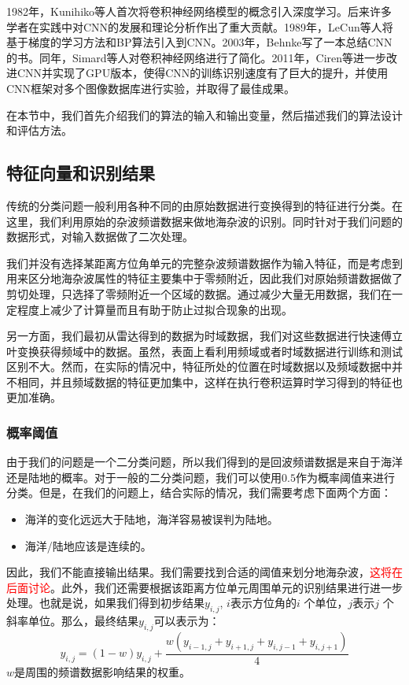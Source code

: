 1982年，Kunihiko等人\cite{fukushima1982neocognitron}首次将卷积神经网络模型的概念引入深度学习。后来许多学者在实践中对CNN的发展和理论分析作出了重大贡献。1989年，LeCun等人将基于梯度的学习方法\cite{lecun1998gradient}和BP算法\cite{lecun1989backpropagation}引入到CNN。2003年，Behnke写了一本总结CNN\cite{behnke2003hierarchical}的书。同年，Simard等人\cite{simard2003best}对卷积神经网络进行了简化。2011年，Ciren等\cite{ciresan2011flexible}进一步改进CNN并实现了GPU版本，使得CNN的训练识别速度有了巨大的提升，并使用CNN框架对多个图像数据库进行实验，并取得了最佳成果。

在本节中，我们首先介绍我们的算法的输入和输出变量，然后描述我们的算法设计和评估方法。
\subsection{特征向量和识别结果}
传统的分类问题一般利用各种不同的由原始数据进行变换得到的特征进行分类。在这里，我们利用原始的杂波频谱数据来做地海杂波的识别。同时针对于我们问题的数据形式，对输入数据做了二次处理。

我们并没有选择某距离方位角单元的完整杂波频谱数据作为输入特征，而是考虑到用来区分地海杂波属性的特征主要集中于零频附近，因此我们对原始频谱数据做了剪切处理，只选择了零频附近一个区域的数据。通过减少大量无用数据，我们在一定程度上减少了计算量而且有助于防止过拟合现象的出现。

另一方面，我们最初从雷达得到的数据为时域数据，我们对这些数据进行快速傅立叶变换获得频域中的数据。虽然，表面上看利用频域或者时域数据进行训练和测试区别不大。然而，在实际的情况中，特征所处的位置在时域数据以及频域数据中并不相同，并且频域数据的特征更加集中，这样在执行卷积运算时学习得到的特征也更加准确。

\subsubsection{概率阈值}
由于我们的问题是一个二分类问题，所以我们得到的是回波频谱数据是来自于海洋还是陆地的概率。对于一般的二分类问题，我们可以使用$ 0.5 $作为概率阈值来进行分类。但是，在我们的问题上，结合实际的情况，我们需要考虑下面两个方面：

\begin{itemize}
	\item 海洋的变化远远大于陆地，海洋容易被误判为陆地。
	\item 海洋/陆地应该是连续的。
\end{itemize}

因此，我们不能直接输出结果。我们需要找到合适的阈值来划分地海杂波，\textcolor{red}{这将在后面讨论}。此外，我们还需要根据该距离方位单元周围单元的识别结果进行进一步处理。也就是说，如果我们得到初步结果$y_{i, j}$, $i$表示方位角的$ i $ 个单位，$ j $表示$ j $ 个斜率单位。那么，最终结果$y_{i, j}$可以表示为：
\begin{equation}
y_{i, j} = (1 - w)  y_{i, j} + \frac{w  (y_{i - 1, j} + y_{i + 1, j} + y_{i, j - 1} + y_{i, j + 1})}{4}
\end{equation}
$ w $是周围的频谱数据影响结果的权重。
